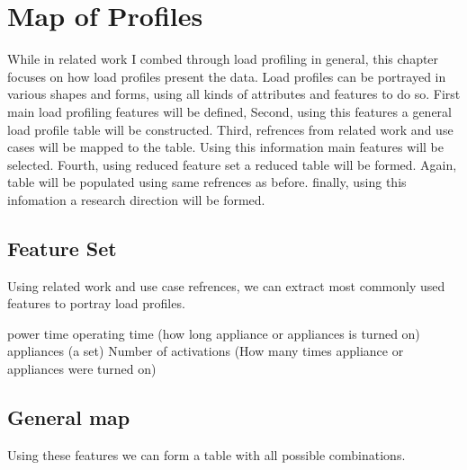 \chapter{Map of Profiles} %

\label{Chapter6} %

While in related work I combed through load profiling in general, this
chapter focuses on how load profiles present the data.  
Load profiles can be portrayed in various shapes and forms,
using all kinds of attributes and features to do so. 
First main load profiling features will be defined,
Second, using this features a general load profile table will be constructed.
Third, refrences from related work and use cases will be mapped to the table.
Using this information main features will be selected.
Fourth, using reduced feature set a reduced table will be formed.
Again, table will be populated using same refrences as before.
finally, using this infomation a research direction will be formed.

\section{Feature Set}

Using related work and use case refrences,
we can extract most commonly used features to portray load profiles.

\begin{outline}
    \1 power
    \1 time
    \1 operating time (how long appliance or appliances is turned on)
    \1 appliances (a set)
    \1 Number of activations (How many times appliance or appliances were turned on)
\end{outline}


\section{General map}
Using these features we can form a table with all possible combinations. 

